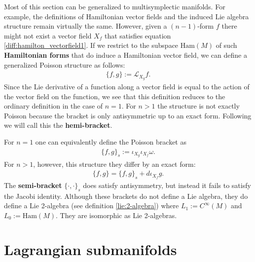     \begin{remark}\label{symplectic:hamiltonian_forms}
        Most of this section can be generalized to multisymplectic manifolds. For example, the definitions of Hamiltonian vector fields and the induced Lie algebra structure remain virtually the same. However, given a $(n-1)$-form $f$ there might not exist a vector field $X_f$ that satisfies equation \ref{diff:hamilton_vectorfield1}. If we restrict to the subspace $\text{Ham}(M)$ of such \textbf{Hamiltonian forms} that do induce a Hamiltonian vector field, we can define a generalized Poisson structure as follows:
        \begin{gather}
            \{f, g\} := \mathcal{L}_{X_g}f.
        \end{gather}
        Since the Lie derivative of a function along a vector field is equal to the action of the vector field on the function, we see that this definition reduces to the ordinary definition in the case of $n=1$. For $n>1$ the structure is not exactly Poisson because the bracket is only antisymmetric up to an exact form. Following \cite{category_symplectic} we will call this the \textbf{hemi-bracket}.

        For $n=1$ one can equivalently define the Poisson bracket as
        \begin{gather}
            \{f,g\}_s := \iota_{X_g}\iota_{X_f}\omega.
        \end{gather}
        For $n>1$, however, this structure they differ by an exact form:
        \begin{gather}
            \{f,g\} = \{f,g\}_s + d\iota_{X_f}g.
        \end{gather}
        The \textbf{semi-bracket} $\{\cdot,\cdot\}_s$ does satisfy antisymmetry, but instead it fails to satisfy the Jacobi identity. Although these brackets do not define a Lie algebra, they do define a Lie 2-algebra (see definition \ref{lie:2-algebra}) where $L_1:=C^\infty(M)$ and $L_0:=\text{Ham}(M)$. They are isomorphic as Lie 2-algebras.
    \end{remark}

\section{Lagrangian submanifolds}


